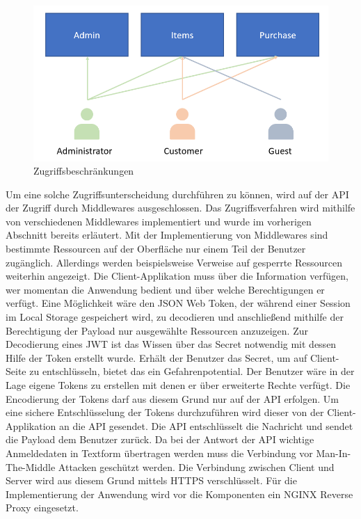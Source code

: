 \documentclass[utf8,biblatex]{lni}
\begin{document}
\begin{figure}
  \centering
  \includegraphics[width=\textwidth]{images/access.png}
  \caption[Zugriffsbeschränkungen]{Zugriffsbeschränkungen} 
  \label{access-desc}
\end{figure} 

Um eine solche Zugriffsunterscheidung durchführen zu können, wird auf der API der Zugriff durch Middlewares ausgeschlossen. 
Das Zugriffsverfahren wird mithilfe von verschiedenen Middlewares implementiert und wurde im vorherigen Abschnitt bereits erläutert. 
Mit der Implementierung von Middlewares sind bestimmte Ressourcen auf der Oberfläche nur einem Teil der Benutzer zugänglich. 
Allerdings werden beispielsweise Verweise auf gesperrte Ressourcen weiterhin angezeigt. 
Die Client-Applikation muss über die Information verfügen, wer momentan die Anwendung bedient und über welche Berechtigungen er verfügt. 
Eine Möglichkeit wäre den JSON Web Token, der während einer Session im Local Storage gespeichert wird, zu decodieren und anschließend 
mithilfe der Berechtigung der Payload nur ausgewählte Ressourcen anzuzeigen. 
Zur Decodierung eines JWT ist das Wissen über das Secret notwendig mit dessen Hilfe der Token erstellt wurde. 
Erhält der Benutzer das Secret, um auf Client-Seite zu entschlüsseln, bietet das ein Gefahrenpotential. 
Der Benutzer wäre in der Lage eigene Tokens zu erstellen mit denen er über erweiterte Rechte verfügt. 
Die Encodierung der Tokens darf aus diesem Grund nur auf der API erfolgen. 
Um eine sichere Entschlüsselung der Tokens durchzuführen wird dieser von der Client-Applikation an die API 
gesendet. Die API entschlüsselt die Nachricht und sendet die Payload dem Benutzer zurück. 
Da bei der Antwort der API wichtige Anmeldedaten in Textform übertragen werden muss die Verbindung vor Man-In-The-Middle Attacken geschützt werden. 
Die Verbindung zwischen Client und Server wird aus diesem Grund mittels HTTPS verschlüsselt. 
Für die Implementierung der Anwendung wird vor die Komponenten ein NGINX Reverse Proxy eingesetzt. 
\end{document}
